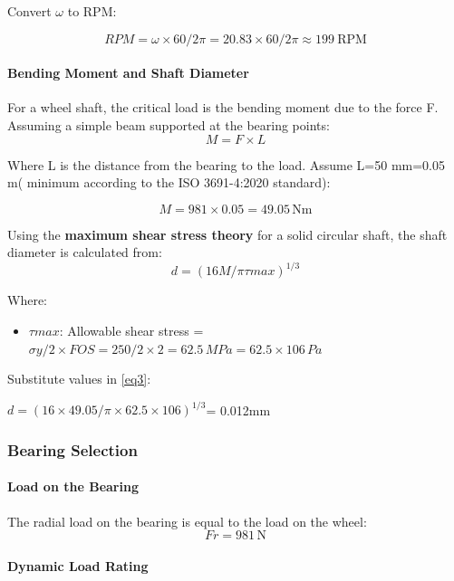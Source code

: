 \documentclass[../../main]{subfiles}
\begin{document}
Convert $\omega$ to RPM:

$$ RPM = \omega \times 60/2\pi = 20.83 \times 60/2\pi \approx 199 \  \text{RPM}$$

\paragraph{Bending Moment and Shaft Diameter}

For a wheel shaft, the critical load is the bending moment due to the
force F. Assuming a simple beam supported at the bearing points:
\begin{equation}
  M = F \times L
\label{eq2}
\end{equation}

Where L is the distance from the bearing to the load. Assume
L=50 mm=0.05 \\m( minimum according to the ISO 3691-4:2020 standard):

$$ M = 981 \times 0.05 = 49.05\, \text{Nm}$$

Using the \textbf{maximum shear stress theory} for a solid circular
shaft, the shaft diameter is calculated from:
\begin{equation}  
 d = (16M/\pi\tau max)^{1/3} 
 \label{eq3}
\end{equation}

Where:

\begin{itemize}
\item
  \(\tau max\): Allowable shear stress =
  \(\sigma y/2 \times FOS = 250/2 \times 2 = 62.5\, MPa = 62.5 \times 106\, Pa\)
\end{itemize}

Substitute values in \cref{eq3}:

\(d = (16 \times 49.05/\pi \times 62.5 \times 106)^{1/3}\)= 0.012mm

\subsubsection{Bearing Selection}

\paragraph{ Load on the Bearing}

The radial load on the bearing is equal to the load on the wheel:
$$Fr = 981\, \text{N}$$

\paragraph{Dynamic Load Rating}
\end{document}
